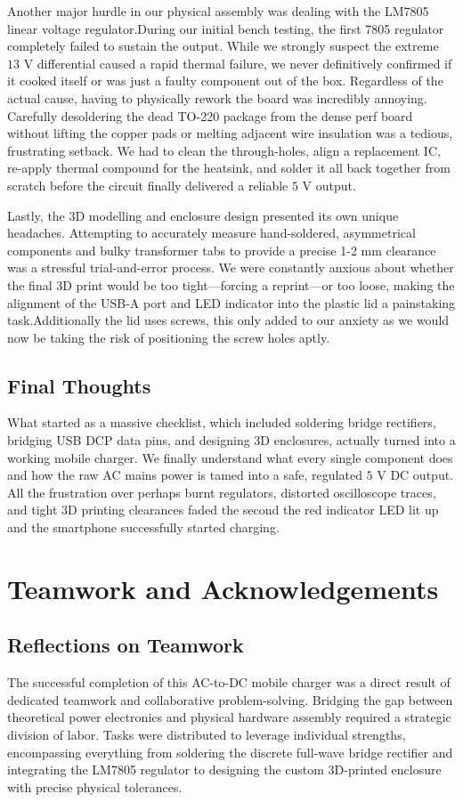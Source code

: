 \documentclass[journal,12pt,onecolumn]{IEEEtran}
\begin{document}
Another major hurdle in our physical assembly was dealing with the LM7805 linear voltage regulator.During our initial bench testing, the first 7805 regulator completely failed to sustain the output. While we strongly suspect the extreme $13\text{ V}$ differential caused a rapid thermal failure, we never definitively confirmed if it cooked itself or was just a faulty component out of the box. Regardless of the actual cause, having to physically rework the board was incredibly annoying. Carefully desoldering the dead TO-220 package from the dense perf board without lifting the copper pads or melting adjacent wire insulation was a tedious, frustrating setback. We had to clean the through-holes, align a replacement IC, re-apply thermal compound for the heatsink, and solder it all back together from scratch before the circuit finally delivered a reliable $5\text{ V}$ output.

Lastly, the 3D modelling and enclosure design presented its own unique headaches. Attempting to accurately measure hand-soldered, asymmetrical components and bulky transformer tabs to provide a precise 1-2 mm clearance was a stressful trial-and-error process. We were constantly anxious about whether the final 3D print would be too tight---forcing a reprint---or too loose, making the alignment of the USB-A port and LED indicator into the plastic lid a painstaking task.Additionally the lid uses screws, this only added to our anxiety as we would now be taking the risk of positioning the screw holes aptly.
		
\subsection{Final Thoughts}
What started as a massive checklist, which included soldering bridge rectifiers, bridging USB DCP data pins, and designing 3D enclosures, actually turned into a working mobile charger. We finally understand what every single component does and how the raw AC mains power is tamed into a safe, regulated $5\text{ V}$ DC output. All the frustration over perhaps burnt regulators, distorted oscilloscope traces, and tight 3D printing clearances faded the second the red indicator LED lit up and the smartphone successfully started charging.
\newpage
\section{Teamwork and Acknowledgements}
		
\subsection*{Reflections on Teamwork}
The successful completion of this AC-to-DC mobile charger was a direct result of dedicated teamwork and collaborative problem-solving. Bridging the gap between theoretical power electronics and physical hardware assembly required a strategic division of labor. Tasks were distributed to leverage individual strengths, encompassing everything from soldering the discrete full-wave bridge rectifier and integrating the LM7805 regulator to designing the custom 3D-printed enclosure with precise physical tolerances. 
		
\end{document}
